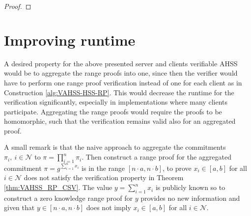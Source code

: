 \begin{proof}

\end{proof}


\section{Improving runtime}
\label{sec:aggregation}
A desired property for the above presented server and clients verifiable AHSS would be to aggregate the range proofs into one, since then the verifier would have to perform one range proof verification instead of one for each client as in Construction \ref{alg:VAHSS-HSS-RP}. This would decrease the runtime for the verification significantly, especially in implementations where many clients participate. Aggregating the range proofs would require the proofs to be homomorphic, such that the verification remains valid also for an aggregated proof.

A small remark is that the naive approach to aggregate the commitments $\pi_i, \: i\in\mathcal{N}$ to $\pi = \prod_{i=1}^n \pi_i$. Then construct a range proof for the aggregated commitment $\pi = g^{\sum_{i=1}^n x_i}$ is in the range $[n\cdot a,n\cdot b]$, to prove $x_i \in [a,b]$ for all $i \in\mathcal{N}$  does not satisfy the verification property in Theorem \ref{thm:VAHSS_RP_CSV}. The value $y=\sum_{i=1}^n x_i$ is publicly known so to construct a zero knowledge range proof for $y $ provides no new information and given that $y\in [n\cdot a,n\cdot b]$ does not imply $x_i\in [a,b]$ for all $i\in\mathcal{N}$. 

